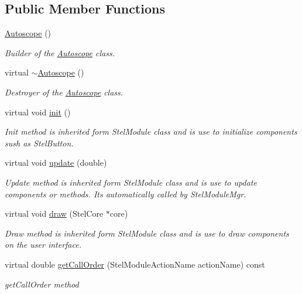 \subsection*{Public Member Functions}
\begin{DoxyCompactItemize}
\item 
\hyperlink{class_autoscope_a70213dc05856f7f6592d089d14f08f68}{Autoscope} ()
\begin{DoxyCompactList}\small\item\em Builder of the \hyperlink{class_autoscope}{Autoscope} class. \end{DoxyCompactList}\item 
virtual \hyperlink{class_autoscope_a8ed25b0eb945f3d2a2a3652322b14b42}{$\sim$\+Autoscope} ()
\begin{DoxyCompactList}\small\item\em Destroyer of the \hyperlink{class_autoscope}{Autoscope} class. \end{DoxyCompactList}\item 
virtual void \hyperlink{class_autoscope_a0aaa7e7edbdd749e209dc42ee360f3a5}{init} ()
\begin{DoxyCompactList}\small\item\em Init method is inherited form Stel\+Module class and is use to initialize components sush as Stel\+Button. \end{DoxyCompactList}\item 
virtual void \hyperlink{class_autoscope_a3def05ed6ebac1d2f0245c96c1719d0a}{update} (double)
\begin{DoxyCompactList}\small\item\em Update method is inherited form Stel\+Module class and is use to update components or methods. It\textquotesingle{}s automatically called by Stel\+Module\+Mgr. \end{DoxyCompactList}\item 
virtual void \hyperlink{class_autoscope_a268e2b524e0abd079f76c55e8443e907}{draw} (Stel\+Core $\ast$core)
\begin{DoxyCompactList}\small\item\em Draw method is inherited form Stel\+Module class and is use to draw components on the user interface. \end{DoxyCompactList}\item 
virtual double \hyperlink{class_autoscope_ad9607f8ffdd72687a19d160a068e1251}{get\+Call\+Order} (Stel\+Module\+Action\+Name action\+Name) const 
\begin{DoxyCompactList}\small\item\em get\+Call\+Order method \end{DoxyCompactList}\item 

\end{DoxyCompactItemize}
